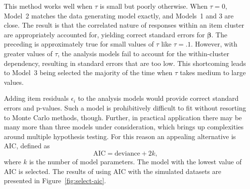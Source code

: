 \documentclass[12pt, letterpaper]{article}
\begin{document}
This method works well when $\tau$ is small but poorly otherwise.
When $\tau = 0$, Model~2 matches the data generating model exactly, and Models~1 and 3 are close. The result is that the correlated nature of responses within an item cluster are appropriately accounted for, yielding correct standard errors for $\mathbf{\beta}$. The preceding is approximately true for small values of $\tau$ like $\tau = .1$. However, with greater values of $\tau$, the analysis models fail to account for the within-cluster dependency, resulting in standard errors that are too low. This shortcoming leads to Model~3 being selected the majority of the time when $\tau$ takes medium to large values.


Adding item residuals $\epsilon_i$ to the analysis models would provide correct standard errors and p-values. Such a model is prohibitively difficult to fit without resorting to Monte Carlo methods, though. Further, in practical application there may be many more than three models under consideration, which brings up complexities around multiple hypothesis testing. For this reason an appealing alternative is AIC, defined as
\begin{equation} \label{eq:aic}
	\mathrm{AIC} = \mathrm{deviance} + 2k
,\end{equation}
where $k$ is the number of model parameters. The model with the lowest value of AIC is selected. The results of using AIC with the simulated datasets are presented in Figure~\ref{fig:select-aic}. 
\end{document}
